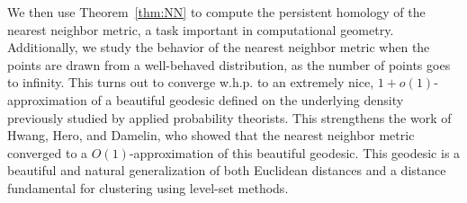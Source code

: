 
 We then use Theorem~\ref{thm:NN} to compute the persistent homology
of the nearest neighbor metric, a task important in computational geometry.
Additionally, we study the behavior of the nearest neighbor metric when the
points are drawn from a well-behaved distribution, as the number of points
goes to infinity. This turns out to converge w.h.p. to an extremely nice,
$1+o(1)$-approximation of a beautiful geodesic defined on the underlying
density previously studied by applied probability theorists. This
strengthens the work of Hwang, Hero, and Damelin, who showed that the
nearest neighbor metric converged to a $O(1)$-approximation of this
beautiful geodesic. This geodesic is a beautiful and natural generalization
of both Euclidean distances and a distance fundamental for clustering using
level-set methods.
